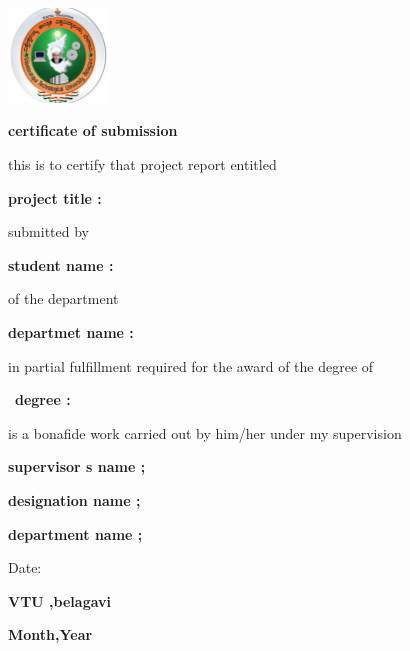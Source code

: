 \documentclass[a4paper,12pt]{report}
\begin{document}
\begin{titlepage}
   \centering
 \includegraphics[width=0.2\textwidth]{vtu_logo.jpg}\par\vspace{1cm}
 \vspace{1cm}
 {\bfseries\LARGE certificate of submission\par}
\vspace{1.5cm}
\begin{flushleft}
 \Large
  this is to certify that project report entitled \par
 \textbf{project title : 
\underline{\hspace{7cm}}}\par
submitted by \par
\textbf{student name : \underline{\hspace{7cm}}}\par
of the department \par\textbf{departmet name :\underline { \hspace{7cm}}}\par
in partial fulfillment required for the award of the degree of \par\
\textbf{degree : \underline{\hspace{7cm}}}\par 
is a bonafide work carried out by him/her under my supervision 
\end{flushleft}
\vspace{2cm}
\begin{flushright}
\Large
\begin{flushright}
    \Large
    \textbf{supervisor s name ; \underline{\hspace{7cm}}}\par
    \textbf{designation name ; \underline{\hspace{7cm}}}\par
    \textbf{department name ; \underline{\hspace{7cm}}}\par
    \vspace{0.5cm}
    \large
    Date:\underline{\hspace{5cm}}
\end{flushright}
\vspace{2cm}                                                                               

\begin{center}
    \Large
    \textbf{VTU ,belagavi}\par
    \large
    \textbf{Month,Year}
\end{center}
\end{flushright}
\end{titlepage}
\end{document}
